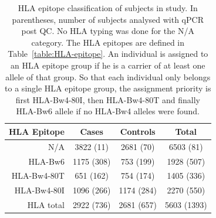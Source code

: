 \documentclass[12pt,a4paper,twoside]{article}
\begin{document}
\begin{table} [h]
\begin{center}
\footnotesize
\begin{tabular}{rccc}
  \hline
  HLA Epitope & Cases & Controls & Total \\
  \hline
    N/A & 3822 (11) & 2681 (70) & 6503 (81) \\
    \hline
    HLA-Bw6 & 1175 (308) & 753 (199) & 1928 (507) \\
    HLA-Bw4-80T  & 651 (162)  & 754 (174) & 1405 (336) \\
    HLA-Bw4-80I & 1096 (266) & 1174 (284) & 2270 (550) \\
    \hline
    HLA total & 2922 (736) & 2681 (657) & 5603 (1393) \\
\end{tabular}
\end{center}
    \caption{
        HLA epitope classification of subjects in study.
        In parentheses, number of subjects analysed with qPCR post QC.
        No HLA typing was done for the N/A category.
        The HLA epitopes are defined in Table~\ref{table:HLA-epitope}.
        An individual is assigned to an HLA epitope group if he is a carrier of at least one allele of that group.
        So that each individual only belongs to a single HLA epitope group,
        the assignment priority is first HLA-Bw4-80I, then HLA-Bw4-80T and finally HLA-Bw6 allele if no HLA-Bw4 alleles 
        were found.
    }
    \label{table:HLA-typing}
\end{table}
\end{document}
